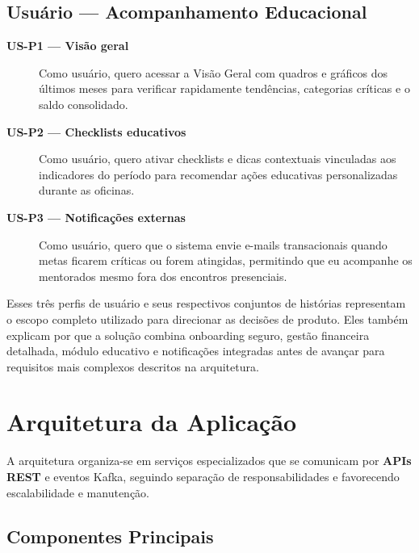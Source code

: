 \subsection{Usuário — Acompanhamento Educacional}
\begin{description}
    \item[\textbf{US-P1 — Visão geral}] Como usuário, quero acessar a Visão Geral com quadros e gráficos dos últimos meses para verificar rapidamente tendências, categorias críticas e o saldo consolidado.
    \item[\textbf{US-P2 — Checklists educativos}] Como usuário, quero ativar checklists e dicas contextuais vinculadas aos indicadores do período para recomendar ações educativas personalizadas durante as oficinas.
    \item[\textbf{US-P3 — Notificações externas}] Como usuário, quero que o sistema envie e-mails transacionais quando metas ficarem críticas ou forem atingidas, permitindo que eu acompanhe os mentorados mesmo fora dos encontros presenciais.
\end{description}

Esses três perfis de usuário e seus respectivos conjuntos de histórias representam o escopo completo utilizado para direcionar as decisões de produto. Eles também explicam por que a solução combina onboarding seguro, gestão financeira detalhada, módulo educativo e notificações integradas antes de avançar para requisitos mais complexos descritos na arquitetura.

\section{Arquitetura da Aplicação}

A arquitetura organiza-se em serviços especializados que se comunicam por \textbf{APIs REST} e eventos Kafka, seguindo separação de responsabilidades e favorecendo escalabilidade e manutenção.

\subsection{Componentes Principais}

